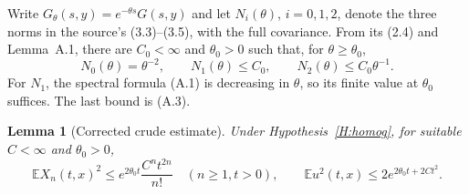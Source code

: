 \documentclass[12pt]{article}
\numberwithin{equation}{section}
\newtheorem{lemma}[theorem]{Lemma}
\theoremstyle{definition}
\newcommand{\E}{\mathbb{E}}
\begin{document}
Write $G_\theta(s,y)=e^{-\theta s}G(s,y)$ and let
$N_i(\theta)$, $i=0,1,2$, denote the three norms in the source's
(3.3)--(3.5), with the full covariance. From its (2.4) and Lemma~A.1,
there are $C_0<\infty$ and $\theta_0>0$ such that, for
$\theta\ge\theta_0$,
\begin{equation}\label{E:crude-norms}
  N_0(\theta)=\theta^{-2},\qquad
  N_1(\theta)\le C_0,\qquad N_2(\theta)\le C_0\theta^{-1}.
\end{equation}
For $N_1$, the spectral formula (A.1) is decreasing in $\theta$, so its
finite value at $\theta_0$ suffices. The last bound is (A.3).

\begin{lemma}[Corrected crude estimate]\label{L:crude-corrected}
  Under Hypothesis~\ref{H:homog}, for suitable $C<\infty$ and
  $\theta_0>0$,
  \begin{equation}\label{E:crude-corrected}
    \E X_n(t,x)^2\le e^{2\theta_0t}\frac{C^nt^{2n}}{n!}
    \quad(n\ge1,t>0),\qquad
    \E u^2(t,x)\le2e^{2\theta_0t+2Ct^2}.
  \end{equation}
\end{lemma}
\end{document}
